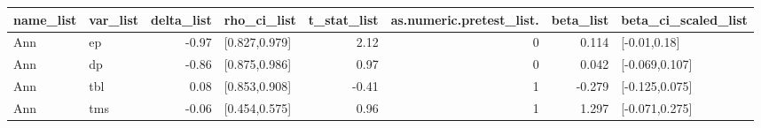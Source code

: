\begin{table}[ht]
\centering
\begin{tabular}{llrlrrrl}
  \hline
name\_list & var\_list & delta\_list & rho\_ci\_list & t\_stat\_list & as.numeric.pretest\_list. & beta\_list & beta\_ci\_scaled\_list \\ 
  \hline
Ann & ep & -0.97 & [0.827,0.979] & 2.12 & 0 & 0.114 & [-0.01,0.18] \\ 
  Ann & dp & -0.86 & [0.875,0.986] & 0.97 & 0 & 0.042 & [-0.069,0.107] \\ 
  Ann & tbl & 0.08 & [0.853,0.908] & -0.41 & 1 & -0.279 & [-0.125,0.075] \\ 
  Ann & tms & -0.06 & [0.454,0.575] & 0.96 & 1 & 1.297 & [-0.071,0.275] \\ 
   \hline
\end{tabular}
\end{table}
